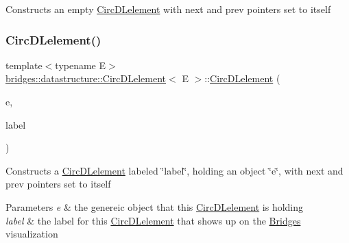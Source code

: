 Constructs an empty \hyperlink{classbridges_1_1datastructure_1_1_circ_d_lelement}{Circ\+D\+Lelement} with next and prev pointers set to itself \mbox{\label{classbridges_1_1datastructure_1_1_circ_d_lelement_a88232de87ec750fccd655d6591870f4c}} 
\subsubsection{\texorpdfstring{Circ\+D\+Lelement()}{CircDLelement()}\hspace{0.1cm}{\footnotesize\ttfamily [2/4]}}
{\footnotesize\ttfamily template$<$typename E$>$ \\
\hyperlink{classbridges_1_1datastructure_1_1_circ_d_lelement}{bridges\+::datastructure\+::\+Circ\+D\+Lelement}$<$ E $>$\+::\hyperlink{classbridges_1_1datastructure_1_1_circ_d_lelement}{Circ\+D\+Lelement} (\begin{DoxyParamCaption}\item[{E}]{e,  }\item[{string}]{label }\end{DoxyParamCaption})\hspace{0.3cm}{\ttfamily [inline]}}

Constructs a \hyperlink{classbridges_1_1datastructure_1_1_circ_d_lelement}{Circ\+D\+Lelement} labeled \char`\"{}label\char`\"{}, holding an object \char`\"{}e\char`\"{}, with next and prev pointers set to itself 
\begin{DoxyParams}{Parameters}
{\em e} & the genereic object that this \hyperlink{classbridges_1_1datastructure_1_1_circ_d_lelement}{Circ\+D\+Lelement} is holding \\
\hline
{\em label} & the label for this \hyperlink{classbridges_1_1datastructure_1_1_circ_d_lelement}{Circ\+D\+Lelement} that shows up on the \hyperlink{classbridges_1_1_bridges}{Bridges} visualization \\
\hline
\end{DoxyParams}
\mbox{\label{classbridges_1_1datastructure_1_1_circ_d_lelement_a8db4aa80feb388d5206d657d80385f16}} 
